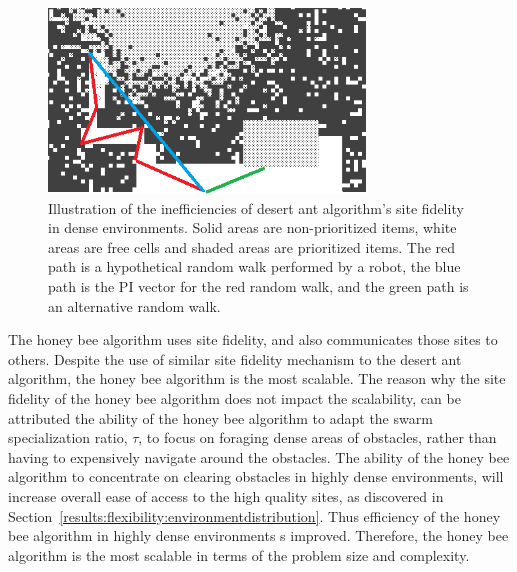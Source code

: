 \begin{figure}[!htb]
\centering
\includegraphics[width=0.75\textwidth]{chapters/chapter6/figures/problem-scalability-desertant.png}
\caption{Illustration of the inefficiencies of desert ant algorithm's site fidelity in dense environments. Solid areas are non-prioritized items, white areas are free cells and shaded areas are prioritized items. The red path is a hypothetical random walk performed by a robot, the blue path is the PI vector for the red random walk, and the green path is an alternative random walk.}
\label{fig:desertantsitefidelity}
\end{figure}

The honey bee algorithm uses site fidelity, and also communicates those sites to others. Despite the use of similar site fidelity mechanism to the desert ant algorithm, the honey bee algorithm is the most scalable. The reason why the site fidelity of the honey bee algorithm does not impact the scalability, can be attributed the ability of the honey bee algorithm to adapt the swarm specialization ratio, $\tau$, to focus on foraging dense areas of obstacles, rather than having to expensively navigate around the obstacles. The ability of the honey bee algorithm to concentrate on clearing obstacles in highly dense environments, will increase overall ease of access to the high quality sites, as discovered in Section~\ref{results:flexibility:environmentdistribution}. Thus efficiency of the honey bee algorithm in highly dense environments s improved. Therefore, the honey bee algorithm is the most scalable in terms of the problem size and complexity.

